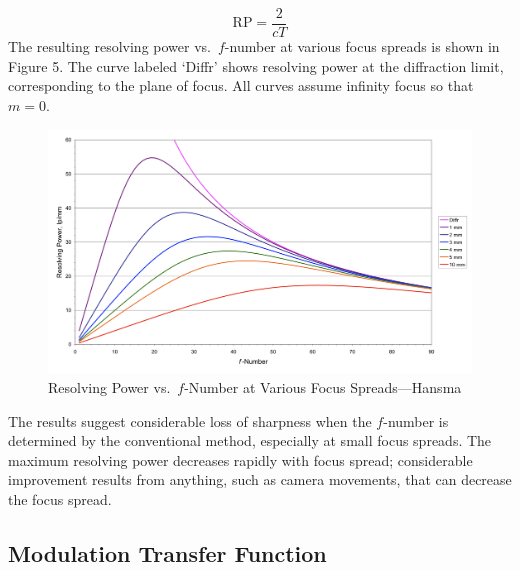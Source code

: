 \documentclass[11pt, oneside]{scrartcl}   	%
\begin{document}
\begin{equation}
\mathrm{RP}= \frac2 {cT}
\end{equation}
The resulting resolving power vs.\ $f$-number at various focus spreads is shown in Figure 5. The curve labeled ‘\textsf{Diffr}’ shows resolving power at the diffraction limit, corresponding to the plane of focus. All curves assume infinity focus so that $m = 0$.
\begin{figure}[htbp] %
   \centering
   \includegraphics[width=\linewidth]{figure/fig_dofd_5} 
   \caption{Resolving Power vs.\ $f$-Number at Various Focus Spreads---Hansma}
   \label{fig:respow}
\end{figure}
The results suggest considerable loss of sharpness when the $f$-number is determined by the conventional method, especially at small focus spreads. The maximum resolving power decreases rapidly with focus spread; considerable improvement results from anything, such as camera movements, that can decrease the focus spread.
\subsection{Modulation Transfer Function}
\end{document}
